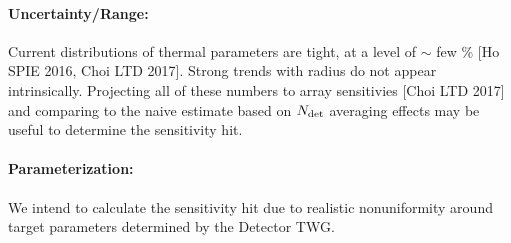 \paragraph{Uncertainty/Range:}
Current distributions of thermal parameters are tight, at a level of $\sim$ few \% [Ho SPIE 2016, Choi LTD 2017]. Strong trends with radius do not appear intrinsically. Projecting all of these numbers to array sensitivies [Choi LTD 2017] and comparing to the naive estimate based on $N_{\mbox{\scriptsize det}}$ averaging effects may be useful to determine the sensitivity hit.

\paragraph{Parameterization:}
We intend to calculate the sensitivity hit due to realistic nonuniformity around target parameters determined by the Detector TWG.
